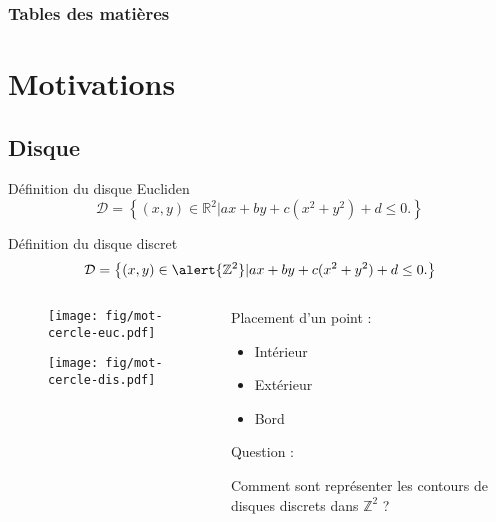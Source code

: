\documentclass{beamer}
\begin{document}
\begin{frame}
  \frametitle{Tables des matières} %
  \setcounter{tocdepth}{1}
  \tableofcontents %
\end{frame}

\section{Motivations}

\subsection{Disque}
\begin{frame}
  {
    \begin{block}{Définition du disque Eucliden}
      $$\mathcal{D} =  \left\{ (x,y) \in \mathbb{R}^{2} |  ax + by + c(x^2 + y^2) + d \leq 0. \right\}$$
    \end{block}
  }
  {
    \begin{block}{Définition du disque discret}
      $$\mathcal{D} =  \left\{ (x,y) \in \alert{\mathbb{Z}^{2}} |  ax + by + c(x^2 + y^2) + d \leq 0. \right\}$$
    \end{block}
  }
  \begin{columns}[t]
    \begin{column}{6cm}
      {
        \begin{figure}[h!]
          \centering
          \texttt{[image: fig/mot-cercle-euc.pdf]}
        \end{figure}
      }
      {
        \begin{figure}[h!]
          \centering
          \texttt{[image: fig/mot-cercle-dis.pdf]}
        \end{figure}
      }
      \end{column}
      \begin{column}{5cm}
        \vspace{-0.4cm}
        \begin{exampleblock}{Placement d'un point :}
          \begin{itemize}
            \item Intérieur
            \item Extérieur
            \item Bord
          \end{itemize}
        \end{exampleblock}

        {
          \begin{block}{Question :}
            \begin{center}  
              \alert{Comment sont représenter les contours de disques discrets dans $\mathbb{Z}^{2}$ ?}
            \end{center}
          \end{block}
        }
      \end{column}
    \end{columns} 
\end{frame}
\end{document}
